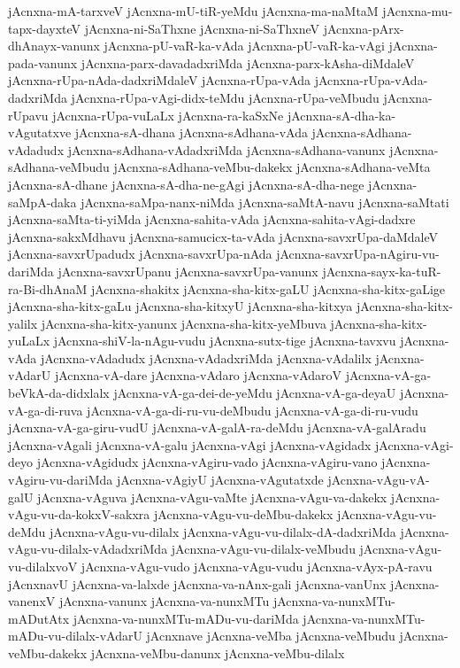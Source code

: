 {jAcnxna-mA-tarxveV
jAcnxna-mU-tiR-yeMdu
jAcnxna-ma-naMtaM
jAcnxna-mu-tapx-dayxteV
jAcnxna-ni-SaThxne
jAcnxna-ni-SaThxneV
jAcnxna-pArx-dhAnayx-vanunx
jAcnxna-pU-vaR-ka-vAda
jAcnxna-pU-vaR-ka-vAgi
jAcnxna-pada-vanunx
jAcnxna-parx-davadadxriMda
jAcnxna-parx-kAsha-diMdaleV
jAcnxna-rUpa-nAda-dadxriMdaleV
jAcnxna-rUpa-vAda
jAcnxna-rUpa-vAda-dadxriMda
jAcnxna-rUpa-vAgi-didx-teMdu
jAcnxna-rUpa-veMbudu
jAcnxna-rUpavu
jAcnxna-rUpa-vuLaLx
jAcnxna-ra-kaSxNe
jAcnxna-sA-dha-ka-vAgutatxve
jAcnxna-sA-dhana
jAcnxna-sAdhana-vAda
jAcnxna-sAdhana-vAdadudx
jAcnxna-sAdhana-vAdadxriMda
jAcnxna-sAdhana-vanunx
jAcnxna-sAdhana-veMbudu
jAcnxna-sAdhana-veMbu-dakekx
jAcnxna-sAdhana-veMta
jAcnxna-sA-dhane
jAcnxna-sA-dha-ne-gAgi
jAcnxna-sA-dha-nege
jAcnxna-saMpA-daka
jAcnxna-saMpa-nanx-niMda
jAcnxna-saMtA-navu
jAcnxna-saMtati
jAcnxna-saMta-ti-yiMda
jAcnxna-sahita-vAda
jAcnxna-sahita-vAgi-dadxre
jAcnxna-sakxMdhavu
jAcnxna-samucicx-ta-vAda
jAcnxna-savxrUpa-daMdaleV
jAcnxna-savxrUpadudx
jAcnxna-savxrUpa-nAda
jAcnxna-savxrUpa-nAgiru-vu-dariMda
jAcnxna-savxrUpanu
jAcnxna-savxrUpa-vanunx
jAcnxna-sayx-ka-tuR-ra-Bi-dhAnaM
jAcnxna-shakitx
jAcnxna-sha-kitx-gaLU
jAcnxna-sha-kitx-gaLige
jAcnxna-sha-kitx-gaLu
jAcnxna-sha-kitxyU
jAcnxna-sha-kitxya
jAcnxna-sha-kitx-yalilx
jAcnxna-sha-kitx-yanunx
jAcnxna-sha-kitx-yeMbuva
jAcnxna-sha-kitx-yuLaLx
jAcnxna-shiV-la-nAgu-vudu
jAcnxna-sutx-tige
jAcnxna-tavxvu
jAcnxna-vAda
jAcnxna-vAdadudx
jAcnxna-vAdadxriMda
jAcnxna-vAdalilx
jAcnxna-vAdarU
jAcnxna-vA-dare
jAcnxna-vAdaro
jAcnxna-vAdaroV
jAcnxna-vA-ga-beVkA-da-didxlalx
jAcnxna-vA-ga-dei-de-yeMdu
jAcnxna-vA-ga-deyaU
jAcnxna-vA-ga-di-ruva
jAcnxna-vA-ga-di-ru-vu-deMbudu
jAcnxna-vA-ga-di-ru-vudu
jAcnxna-vA-ga-giru-vudU
jAcnxna-vA-galA-ra-deMdu
jAcnxna-vA-galAradu
jAcnxna-vAgali
jAcnxna-vA-galu
jAcnxna-vAgi
jAcnxna-vAgidadx
jAcnxna-vAgi-deyo
jAcnxna-vAgidudx
jAcnxna-vAgiru-vado
jAcnxna-vAgiru-vano
jAcnxna-vAgiru-vu-dariMda
jAcnxna-vAgiyU
jAcnxna-vAgutatxde
jAcnxna-vAgu-vA-galU
jAcnxna-vAguva
jAcnxna-vAgu-vaMte
jAcnxna-vAgu-va-dakekx
jAcnxna-vAgu-vu-da-kokxV-sakxra
jAcnxna-vAgu-vu-deMbu-dakekx
jAcnxna-vAgu-vu-deMdu
jAcnxna-vAgu-vu-dilalx
jAcnxna-vAgu-vu-dilalx-dA-dadxriMda
jAcnxna-vAgu-vu-dilalx-vAdadxriMda
jAcnxna-vAgu-vu-dilalx-veMbudu
jAcnxna-vAgu-vu-dilalxvoV
jAcnxna-vAgu-vudo
jAcnxna-vAgu-vudu
jAcnxna-vAyx-pA-ravu
jAcnxnavU
jAcnxna-va-lalxde
jAcnxna-va-nAnx-gali
jAcnxna-vanUnx
jAcnxna-vanenxV
jAcnxna-vanunx
jAcnxna-va-nunxMTu
jAcnxna-va-nunxMTu-mADutAtx
jAcnxna-va-nunxMTu-mADu-vu-dariMda
jAcnxna-va-nunxMTu-mADu-vu-dilalx-vAdarU
jAcnxnave
jAcnxna-veMba
jAcnxna-veMbudu
jAcnxna-veMbu-dakekx
jAcnxna-veMbu-danunx
jAcnxna-veMbu-dilalx
}
